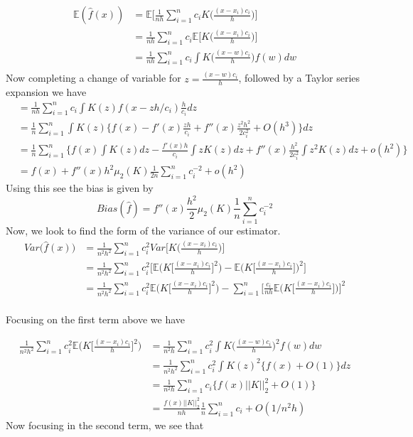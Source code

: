 \documentclass[12pt]{article}  %
\newcommand{\E}{{\mathbb{E}}}
\begin{document}
\begin{enumerate}
\begin{enumerate}
\begin{align*}
\E(\widehat{f}(x))&= \E\Big[\frac{1}{nh}\sum_{i=1}^{n}c_iK\Big(\frac{(x-x_i)c_i}{h}\Big)\Big]\\{}
&= \frac{1}{nh}\sum_{i=1}^{n}c_i\E\Big[K\Big(\frac{(x - x_i)c_i}{h}\Big)\Big]\\
&= \frac{1}{nh}\sum_{i = 1}^{n}c_i\int K\Big(\frac{(x - w)c_i}{h}\Big)f(w)dw\\
\end{align*} Now completing a change of variable for $z = \frac{(x - w)c_i}{h}$, followed by a Taylor series expansion we have 
\begin{align*}
&= \frac{1}{nh}\sum_{i = 1}^{n}c_i\int K(z)f(x - zh/c_i)\frac{h}{c_i}dz\\
&= \frac{1}{n}\sum_{i=1}^{n}\int K(z)\Big\{f(x) - f'(x)\frac{zh}{c_i} + f''(x)\frac{z^2h^2}{2c_i^2} + O(h^3)\Big\} dz\\
&= \frac{1}{n}\sum_{i=1}^{n}\bigg\{f(x)\int K(z)dz - \frac{f'(x)h}{c_i}\int zK(z)dz + f''(x)\frac{h^2}{2c_i^2}\int z^2K(z)dz + o(h^2)\bigg\}\\
&= f(x) + f''(x)h^2\mu_{2}(K)\frac{1}{2n}\sum_{i=1}^{n}c_i^{-2} + o(h^2)
\end{align*}
Using this see the bias is given by $$Bias(\widehat{f}) = f''(x)\frac{h^2}{2}\mu_{2}(K)\frac{1}{n}\sum_{i=1}^{n}c_i^{-2}$$
Now, we look to find the form of the variance of our estimator. 
\begin{align*}
Var\Big(\widehat{f}(x)\Big) &= \frac{1}{n^2h^2}\sum_{i=1}^{n}c_i^2Var\Big[K\Big(\frac{(x-x_i)c_i}{h}\Big)\Big]\\
&= \frac{1}{n^2h^2}\sum_{i=1}^{n}c_i^2\bigg[\E\Big(K\Big[\frac{(x-x_i)c_i}{h}\Big]^2\Big) - \E\Big(K\Big[\frac{(x-x_i)c_i}{h}\Big]\Big)^2\bigg]\\
&= \frac{1}{n^2h^2}\sum_{i=1}^{n}c_i^2\E\Big(K\Big[\frac{(x-x_i)c_i}{h}\Big]^2\Big) - \sum_{i=1}^{n}\bigg[\frac{c_i}{nh}\E\Big(K\Big[\frac{(x-x_i)c_i}{h}\Big]\Big)\bigg]^2\\
\end{align*}

Focusing on the first term above we have 

\begin{align*}
\frac{1}{n^2h^2}\sum_{i=1}^{n}c_i^2\E\Big(K\Big[\frac{(x-x_i)c_i}{h}\Big]^2\Big) &= \frac{1}{n^2h}\sum_{i=1}^{n}c_i^2\int K\Big(\frac{(x - w)c_i}{h}\Big)^2f(w)dw\\
&= \frac{1}{n^2h^2}\sum_{i=1}^{n}c_i^2\int K(z)^2\Big\{f(x) + O(1)\Big\}dz\\
&= \frac{1}{n^2h}\sum_{i=1}^{n}c_i\Big\{f(x)||K||_2^2 + O(1)\Big\}\\
&= \frac{f(x)||K||_2^2}{nh}\frac{1}{n}\sum_{i=1}^{n}c_i + O(1/n^2h)
\end{align*} 
Now focusing in the second term, we see that 


\end{enumerate}
\end{enumerate}
\end{document}

